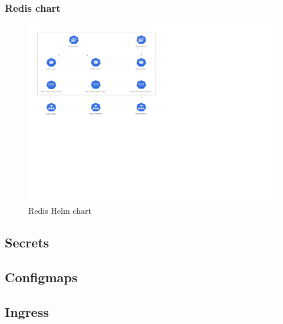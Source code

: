 \documentclass[thesis=B,english]{FITthesis}[2019/12/23]
\begin{document}
\subsubsection{Redis chart}
\begin{figure}[H]
\centering
\caption{Redis Helm chart}
\hspace*{-3.4cm}
\includegraphics[scale=0.5]{redis-diagram}
\end{figure}

\subsection{Secrets}

\subsection{Configmaps}

\subsection{Ingress}
\end{document}
